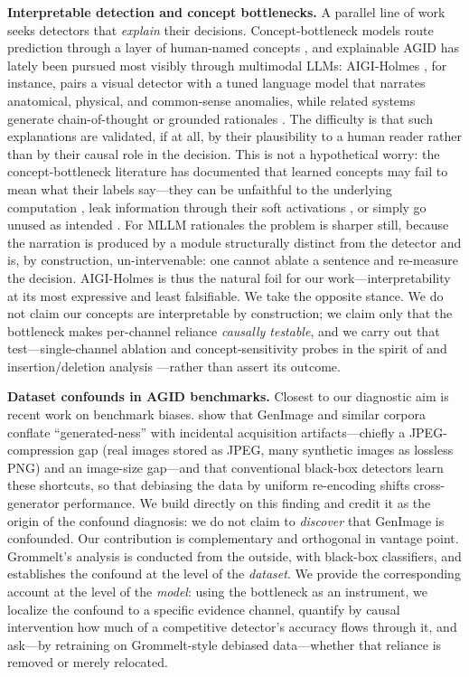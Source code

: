 \textbf{Interpretable detection and concept bottlenecks.} A parallel line of work seeks detectors that \emph{explain} their decisions. Concept-bottleneck models route prediction through a layer of human-named concepts \citep{koh2020concept}, and explainable AGID has lately been pursued most visibly through multimodal LLMs: AIGI-Holmes \citep{zhou2025aigiholmes}, for instance, pairs a visual detector with a tuned language model that narrates anatomical, physical, and common-sense anomalies, while related systems generate chain-of-thought or grounded rationales \citep{huang2025thinkfake, tan2025forenx, ji2025grounded}. The difficulty is that such explanations are validated, if at all, by their plausibility to a human reader rather than by their causal role in the decision. This is not a hypothetical worry: the concept-bottleneck literature has documented that learned concepts may fail to mean what their labels say---they can be unfaithful to the underlying computation \citep{margeloiu2021concept}, leak information through their soft activations \citep{havasi2022addressing}, or simply go unused as intended \citep{mahinpei2021promises}. For MLLM rationales the problem is sharper still, because the narration is produced by a module structurally distinct from the detector and is, by construction, un-intervenable: one cannot ablate a sentence and re-measure the decision. AIGI-Holmes is thus the natural foil for our work---interpretability at its most expressive and least falsifiable. We take the opposite stance. We do not claim our concepts are interpretable by construction; we claim only that the bottleneck makes per-channel reliance \emph{causally testable}, and we carry out that test---single-channel ablation and concept-sensitivity probes in the spirit of \citet{kim2018tcav} and insertion/deletion analysis \citep{petsiuk2018rise}---rather than assert its outcome.

\textbf{Dataset confounds in AGID benchmarks.} Closest to our diagnostic aim is recent work on benchmark biases. \citet{grommelt2024fakejpeg} show that GenImage and similar corpora conflate ``generated-ness'' with incidental acquisition artifacts---chiefly a JPEG-compression gap (real images stored as JPEG, many synthetic images as lossless PNG) and an image-size gap---and that conventional black-box detectors learn these shortcuts, so that debiasing the data by uniform re-encoding shifts cross-generator performance. We build directly on this finding and credit it as the origin of the confound diagnosis: we do not claim to \emph{discover} that GenImage is confounded. Our contribution is complementary and orthogonal in vantage point. Grommelt's analysis is conducted from the outside, with black-box classifiers, and establishes the confound at the level of the \emph{dataset}. We provide the corresponding account at the level of the \emph{model}: using the bottleneck as an instrument, we localize the confound to a specific evidence channel, quantify by causal intervention how much of a competitive detector's accuracy flows through it, and ask---by retraining on Grommelt-style debiased data---whether that reliance is removed or merely relocated.

